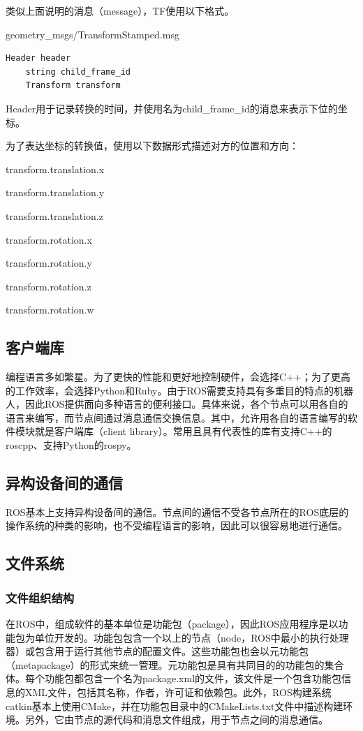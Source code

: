 \documentclass[geye,green,kindle,cn]{elegantnote}
\begin{document}
类似上面说明的消息（message），TF使用以下格式。

geometry\_msgs/TransformStamped.msg
\begin{lstlisting}[frame=single,language=bash]
    Header header 
    string child_frame_id 
    Transform transform 
\end{lstlisting}

Header用于记录转换的时间，并使用名为child\_frame\_id的消息来表示下位的坐标。

为了表达坐标的转换值，使用以下数据形式描述对方的位置和方向：

transform.translation.x

transform.translation.y

transform.translation.z

transform.rotation.x

transform.rotation.y

transform.rotation.z

transform.rotation.w
\subsection{客户端库}
编程语言多如繁星。为了更快的性能和更好地控制硬件，会选择C++；为了更高的工作效率，会选择Python和Ruby。由于ROS需要支持具有多重目的特点的机器人，因此ROS提供面向多种语言的便利接口。具体来说，各个节点可以用各自的语言来编写，而节点间通过消息通信交换信息。其中，允许用各自的语言编写的软件模块就是客户端库（client library）。常用且具有代表性的库有支持C++的roscpp、支持Python的rospy。
\subsection{异构设备间的通信}
ROS基本上支持异构设备间的通信。节点间的通信不受各节点所在的ROS底层的操作系统的种类的影响，也不受编程语言的影响，因此可以很容易地进行通信。
\subsection{文件系统}
\subsubsection{文件组织结构}
在ROS中，组成软件的基本单位是功能包（package），因此ROS应用程序是以功能包为单位开发的。功能包包含一个以上的节点（node，ROS中最小的执行处理器）或包含用于运行其他节点的配置文件。这些功能包也会以元功能包（metapackage）的形式来统一管理。元功能包是具有共同目的的功能包的集合体。每个功能包都包含一个名为package.xml的文件，该文件是一个包含功能包信息的XML文件，包括其名称，作者，许可证和依赖包。此外，ROS构建系统catkin基本上使用CMake，并在功能包目录中的CMakeLists.txt文件中描述构建环境。另外，它由节点的源代码和消息文件组成，用于节点之间的消息通信。
\end{document}
